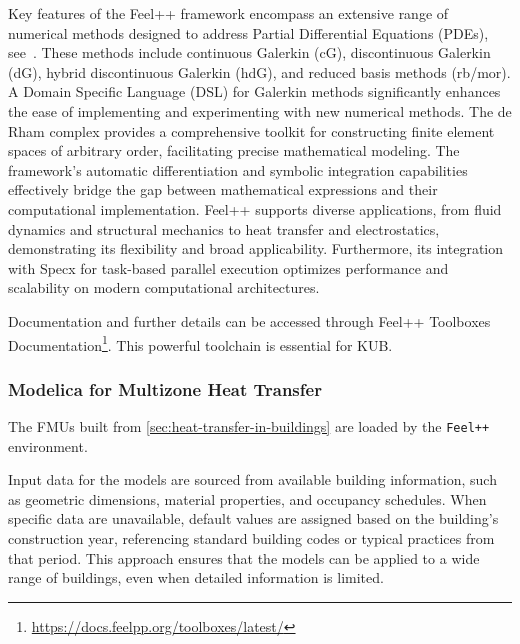 \documentclass[runningheads]{llncs}
\begin{document}
Key features of the Feel++ framework encompass an extensive range of numerical methods designed to address Partial Differential Equations (PDEs), see~\cite{christophe_prudhomme_feelppfeelpp_2024}. 
These methods include continuous Galerkin (cG), discontinuous Galerkin (dG), hybrid discontinuous Galerkin (hdG), and reduced basis methods (rb/mor). 
A Domain Specific Language (DSL) for Galerkin methods significantly enhances the ease of implementing and experimenting with new numerical methods. 
The de Rham complex provides a comprehensive toolkit for constructing finite element spaces of arbitrary order, facilitating precise mathematical modeling. 
The framework's automatic differentiation and symbolic integration capabilities effectively bridge the gap between mathematical expressions and their computational implementation.
Feel++ supports diverse applications, from fluid dynamics and structural mechanics to heat transfer and electrostatics, demonstrating its flexibility and broad applicability.
Furthermore, its integration with Specx for task-based parallel execution optimizes performance and scalability on modern computational architectures.


Documentation and further details can be accessed through Feel++ Toolboxes Documentation\footnote{\url{https://docs.feelpp.org/toolboxes/latest/}}.
This powerful toolchain is essential for KUB.

\subsubsection{Modelica for Multizone Heat Transfer}

The FMUs built from \cref{sec:heat-transfer-in-buildings} are loaded by the \texttt{Feel++} environment.

Input data for the models are sourced from available building information, such as geometric dimensions, material properties, and occupancy schedules.
When specific data are unavailable, default values are assigned based on the building's construction year, referencing standard building codes or typical practices from that period.
This approach ensures that the models can be applied to a wide range of buildings, even when detailed information is limited.
\end{document}
